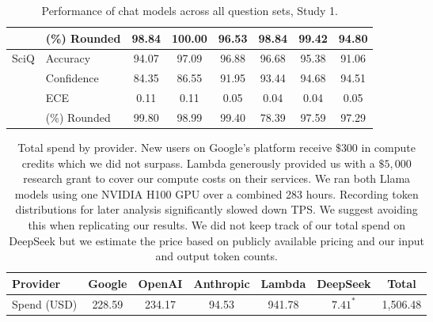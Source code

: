 \documentclass{article}
\begin{document}
\begin{appendices}
\begin{table}
\begin{tabular}{ll | cccccc}
     & (\%) Rounded & 98.84 & 100.00 & 96.53 & 98.84 & 99.42 & 94.80 \\
    \midrule
    \multirow[c]{4}{*}{SciQ} & Accuracy & 94.07 & 97.09 & 96.88 & 96.68 & 95.38 & 91.06 \\
     & Confidence & 84.35 & 86.55 & 91.95 & 93.44 & 94.68 & 94.51 \\
     & ECE & 0.11 & 0.11 & 0.05 & 0.04 & 0.04 & 0.05 \\
     & (\%) Rounded & 99.80 & 98.99 & 99.40 & 78.39 & 97.59 & 97.29 \\
    \bottomrule
    \end{tabular}
    \caption{Performance of chat models across all question sets, Study 1.}

\end{table}


\clearpage

\begin{table}[t]
    \centering

    \begin{tabular}{l|ccccc| c}
        \toprule
        \textbf{Provider}      &  \textbf{Google} & \textbf{OpenAI} & \textbf{Anthropic} & \textbf{Lambda} & \textbf{DeepSeek} & \textbf{Total}\\
        \midrule
        Spend (USD)   &  228.59   & 234.17 &  94.53    &   941.78 & $7.41^*$ & 1,506.48\\
        \bottomrule
        
    \end{tabular}
    \caption{Total spend by provider. New users on Google's platform receive $\$300$ in compute credits which we did not surpass. Lambda generously provided us with a $\$5,000$ research grant to cover our compute costs on their services.  We ran both Llama models using one NVIDIA H100 GPU over a combined 283 hours. Recording token distributions for later analysis significantly slowed down TPS. We suggest avoiding this when replicating our results. We did not keep track of our total spend on DeepSeek but we estimate the price based on publicly available pricing and our input and output token counts.} 
    \label{provider_spend}
\end{table}



\end{appendices}
\end{document}
